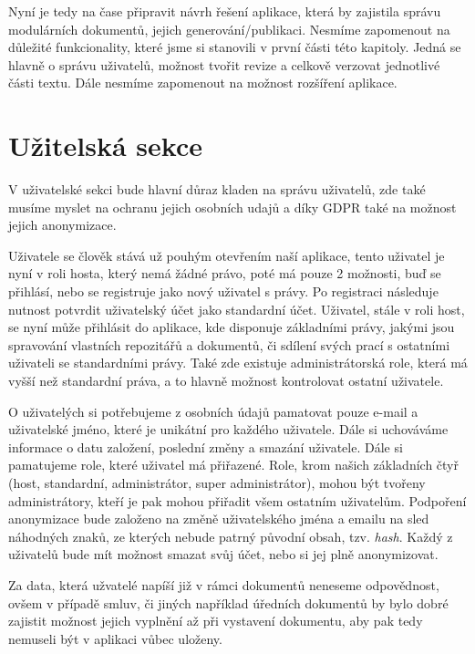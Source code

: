 Nyní je tedy na čase připravit návrh řešení aplikace, která by zajistila správu modulárních dokumentů, jejich generování/publikaci. Nesmíme zapomenout
na důležité funkcionality, které jsme si stanovili v první části této kapitoly. Jedná se hlavně o správu uživatelů, možnost tvořit revize a celkově
verzovat jednotlivé části textu. Dále nesmíme zapomenout na možnost rozšíření aplikace.

\section{Užitelská sekce}

V uživatelské sekci bude hlavní důraz kladen na správu uživatelů, zde také musíme myslet na ochranu jejich osobních udajů a díky GDPR také na
možnost jejich anonymizace.

Uživatele se člověk stává už pouhým otevřením naší aplikace, tento uživatel je nyní v roli hosta, který nemá žádné právo, poté má pouze 2 možnosti, buď se
přihlásí, nebo se registruje jako nový uživatel s právy. Po registraci následuje nutnost potvrdit uživatelský účet jako standardní účet.
Uživatel, stále v roli host, se nyní může přihlásit do aplikace, kde disponuje základními právy, jakými jsou spravování vlastních repozitářů a dokumentů,
či sdílení svých prací s ostatními uživateli se standardními právy. Také zde existuje administrátorská role, která má vyšší než standardní práva,
a to hlavně možnost kontrolovat ostatní uživatele.

O uživatelých si potřebujeme z osobních údajů pamatovat pouze e-mail a uživatelské jméno, které je unikátní pro každého uživatele. Dále si uchováváme
informace o datu založení, poslední změny a smazání uživatele. Dále si pamatujeme role, které uživatel má přiřazené. Role, krom našich základních čtyř
(host, standardní, administrátor, super administrátor), mohou být tvořeny administrátory, kteří je pak mohou přiřadit všem ostatním uživatelům. Podpoření
anonymizace bude založeno na změně uživatelského jména a emailu na sled náhodných znaků, ze kterých nebude patrný původní obsah, tzv. \textit{hash}. Každý z
uživatelů bude mít možnost smazat svůj účet, nebo si jej plně anonymizovat.

Za data, která užvatelé napíší již v rámci dokumentů neneseme odpovědnost, ovšem v případě smluv, či jiných například úředních dokumentů by bylo dobré
zajistit možnost jejich vyplnění až při vystavení dokumentu, aby pak tedy nemuseli být v aplikaci vůbec uloženy.

